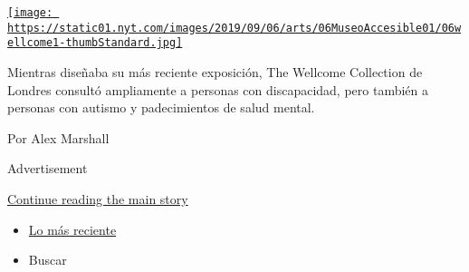 \begin{enumerate}
\begin{enumerate}
    \href{/es/2019/09/10/espanol/cultura/museo-discapacitados-wellcome-collection.html}{\texttt{[image: https://static01.nyt.com/images/2019/09/06/arts/06MuseoAccesible01/06wellcome1-thumbStandard.jpg]}}

    Mientras diseñaba su más reciente exposición, The Wellcome
    Collection de Londres consultó ampliamente a personas con
    discapacidad, pero también a personas con autismo y padecimientos de
    salud mental.

    Por Alex Marshall
  \end{enumerate}
\end{enumerate}

Advertisement

\protect\hyperlink{after-mid1}{Continue reading the main story}

\begin{itemize}
\tightlist
\item
  \protect\hyperlink{stream-panel}{Lo más reciente}
\item
  Buscar
\end{itemize}

